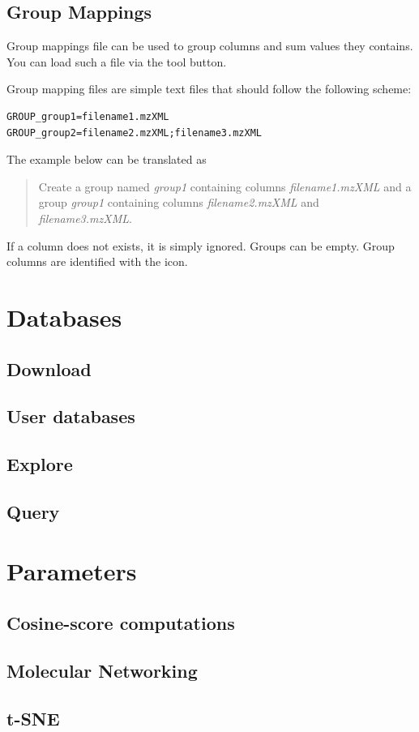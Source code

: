 \documentclass[12pt,a4paper,titlepage,dvipsnames]{article}
\newcommand*{\img}[1]{%
    \raisebox{-.3\baselineskip}{%
        \texttt{[image: \#1]}%
    }%
}
\begin{document}
\subsection{Group Mappings}

Group mappings file can be used to group columns and sum values they contains. You can load such a file via the \img{import-mapping} tool button.

Group mapping files are simple text files that should follow the following scheme:
\begin{verbatim}
GROUP_group1=filename1.mzXML
GROUP_group2=filename2.mzXML;filename3.mzXML
\end{verbatim}

The example below can be translated as
\begin{quote}
Create a group named \emph{group1} containing columns \emph{filename1.mzXML} and a group \emph{group1} containing columns \emph{filename2.mzXML} and \emph{filename3.mzXML}.
\end{quote}

If a column does not exists, it is simply ignored. Groups can be empty. Group columns are identified with the \img{import-mapping} icon.

\section{Databases}
\subsection{Download}
\subsection{User databases}
\subsection{Explore}
\subsection{Query}

\section{Parameters}
\subsection{Cosine-score computations}
\subsection{Molecular Networking}
\subsection{t-SNE}
\end{document}
